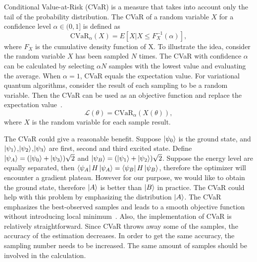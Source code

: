Conditional Value-at-Risk (CVaR) is a measure that takes into account only the tail of the probability distribution. The CVaR of a random variable $X$ for a confidence level $\alpha \in (0, 1]$ is defined as
\begin{equation}
    \mathrm{CVaR}_\alpha(X) = E[X|X \leq F^{-1}_X(\alpha)],
\end{equation}
where $F_X$ is the cumulative density function of X. To illustrate the idea, consider the random variable $X$ has been sampled $N$ times. The CVaR with confidence $\alpha$ can be calculated by selecting $\alpha N$ samples with the lowest value and evaluating the average. When $\alpha=1$, CVaR equals the expectation value. For variational quantum algorithms, consider the result of each sampling to be a random variable. Then the CVaR can be used as an objective function and replace the expectation value~\cite{barkoutsos_improving_2020}. 
\begin{equation}
    \mathcal{L}(\theta) = \mathrm{CVaR}_\alpha(X(\theta)),
\end{equation}
where $X$ is the random variable for each sample result.

The CVaR could give a reasonable benefit. Suppose $\ket{\psi_0}$ is the ground state, and $\ket{\psi_1}$,$\ket{\psi_2}$,$\ket{\psi_3}$ are first, second and third excited state. Define $\ket{\psi_A} = (\ket{\psi_0} + \ket{\psi_3})\sqrt{2}$ and $\ket{\psi_B} = (\ket{\psi_1} + \ket{\psi_2})\sqrt{2}$. Suppose the energy level are equally separated, then $\bra{\psi_A}H\ket{\psi_A} = \bra{\psi_B}H\ket{\psi_B}$, therefore the optimizer will encounter a gradient plateau. However for our purpose, we would like to obtain the ground state, therefore $\ket{A}$ is better than $\ket{B}$ in practice. The CVaR could help with this problem by emphasizing the distribution $\ket{A}$. The CVaR emphasizes the best-observed samples and leads to a smooth objective function without introducing local minimum~\cite{barkoutsos_improving_2020}. Also, the implementation of CVaR is relatively straightforward. Since CVaR throws away some of the samples, the accuracy of the estimation decreases. In order to get the same accuracy, the sampling number needs to be increased. The same amount of samples should be involved in the calculation. 

